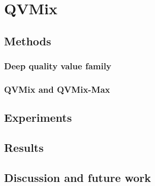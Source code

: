 \chapter{QVMix}\label{ch:qvmix}

\section{Methods}
\subsection{Deep quality value family}
\subsection{QVMix and QVMix-Max}
\section{Experiments}
\section{Results}
\section{Discussion and future work}

